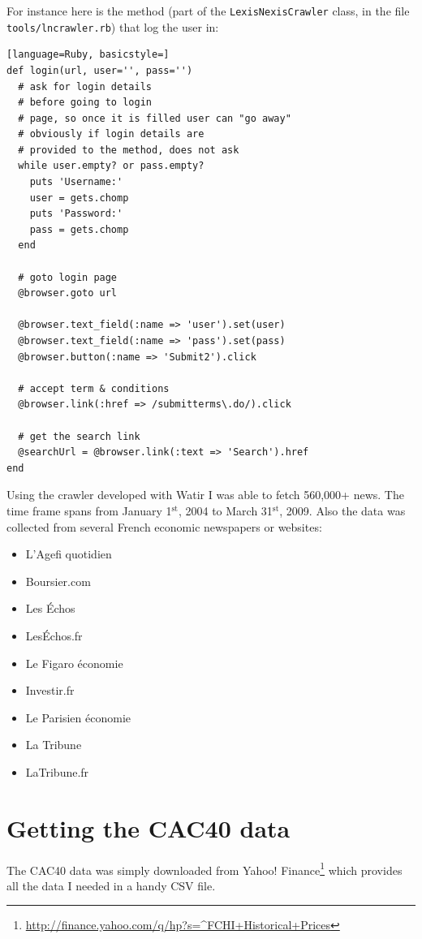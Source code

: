 \documentclass[12pt]{report}
\newcommand{\superscript}[1]{\ensuremath{^{\textrm{#1}}}}
\newcommand{\st}[0]{\superscript{st}}
\begin{document}
			For instance here is the method (part of the \lstinline!LexisNexisCrawler! class, in the file \lstinline!tools/lncrawler.rb!) that log the user in:

			\begin{lstlisting}[language=Ruby, basicstyle=]
def login(url, user='', pass='')
  # ask for login details
  # before going to login
  # page, so once it is filled user can "go away"
  # obviously if login details are
  # provided to the method, does not ask
  while user.empty? or pass.empty?
    puts 'Username:'
    user = gets.chomp
    puts 'Password:'
    pass = gets.chomp
  end

  # goto login page
  @browser.goto url

  @browser.text_field(:name => 'user').set(user)
  @browser.text_field(:name => 'pass').set(pass)
  @browser.button(:name => 'Submit2').click

  # accept term & conditions
  @browser.link(:href => /submitterms\.do/).click

  # get the search link
  @searchUrl = @browser.link(:text => 'Search').href
end
			\end{lstlisting}

			Using the crawler developed with Watir I was able to fetch 560,000+ news. The time frame spans from January 1\st, 2004 to March 31\st, 2009. Also the data was collected from several French economic newspapers or websites:
			\begin{itemize}
				\item L'Agefi quotidien
				\item Boursier.com
				\item Les \'Echos
				\item Les\'Echos.fr
				\item Le Figaro économie
				\item Investir.fr
				\item Le Parisien économie
				\item La Tribune
				\item LaTribune.fr
			\end{itemize}

		\section{Getting the CAC40 data}

			The CAC40 data was simply downloaded from Yahoo! Finance\footnote{\url{http://finance.yahoo.com/q/hp?s=^FCHI+Historical+Prices}} which provides all the data I needed in a handy  CSV file.
\end{document}
